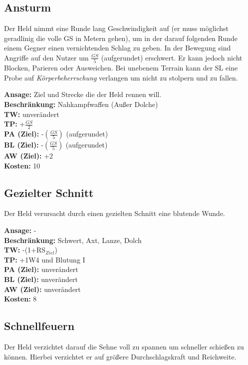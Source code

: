 \subsection{Ansturm}
Der Held nimmt eine Runde lang Geschwindigkeit auf (er muss möglichst geradlinig die volle GS in Metern gehen), um in der darauf folgenden Runde einem Gegner einen vernichtenden Schlag zu geben. In der Bewegung sind Angriffe auf den Nutzer um $\frac{GS}{5}$ (aufgerundet) erschwert. Er kann jedoch nicht Blocken, Parieren oder Ausweichen. Bei unebenem Terrain kann der SL eine Probe auf \textit{Körperbeherrschung} verlangen um nicht zu stolpern und zu fallen.

\textbf{Ansage:} Ziel und Strecke die der Held rennen will. \\
\textbf{Beschränkung:} Nahkampfwaffen (Außer Dolche) \\
\textbf{TW:} unverändert \\
\textbf{TP:} +$\frac{GS}{2}$ \\
\textbf{PA (Ziel):} -$(\frac{GS}{5})$ (aufgerundet) \\
\textbf{BL (Ziel):} -$(\frac{GS}{5})$ (aufgerundet) \\
\textbf{AW (Ziel):} +2 \\
\textbf{Kosten:} 10

\subsection{Gezielter Schnitt}
Der Held verursacht durch einen gezielten Schnitt eine blutende Wunde.

\textbf{Ansage:} - \\
\textbf{Beschränkung:} Schwert, Axt, Lanze, Dolch \\
\textbf{TW:} -(1+RS$_{Ziel}$) \\
\textbf{TP:} +1W4 und Blutung I \\
\textbf{PA (Ziel):} unverändert \\
\textbf{BL (Ziel):} unverändert \\
\textbf{AW (Ziel):} unverändert \\
\textbf{Kosten:} 8

\subsection{Schnellfeuern}
Der Held verzichtet darauf die Sehne voll zu spannen um schneller schießen zu können. Hierbei verzichtet er auf größere Durchschlagskraft und Reichweite.

